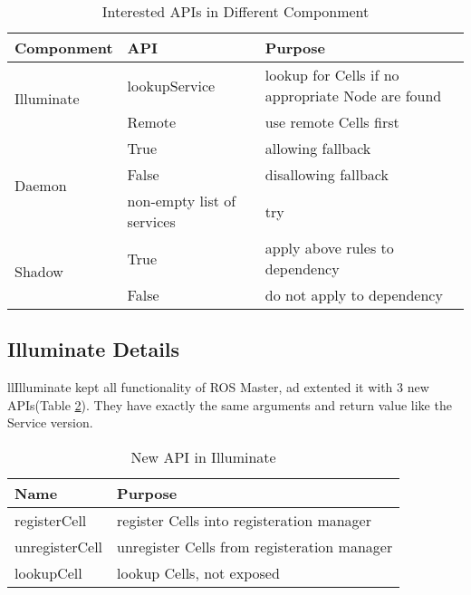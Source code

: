 \begin{table}
    \renewcommand{\arraystretch}{1.3}
    \caption{Interested APIs in Different Componment}
    \label{table:int}
    \centering
    \begin{tabular}{|l|l|l|}
        \hline
        \bfseries Componment & \bfseries  API & \bfseries Purpose \\
        \hline
        \multirow{2}{*}{Illuminate}  & lookupService & lookup for Cells if no appropriate Node are found \\
        \cline{2-3}
                                     & Remote & use remote Cells first \\
        \hline
        \multirow{3}{*}{Daemon}      & True   & allowing fallback \\
        \cline{2-3}
                                     & False  & disallowing fallback \\
        \cline{2-3}
                                     & non-empty list of services & try  \\
        \hline
        \multirow{2}{*}{Shadow} & True   & apply above rules to dependency \\
        \cline{2-3}
                                     & False  & do not apply to dependency \\
        \hline
    \end{tabular}
\end{table} 

\subsection{Illuminate Details}
llIlluminate kept all functionality of ROS Master, ad extented it with 3 new APIs(Table \ref{table:illuminate-api}).
They have exactly the same arguments and return value like the Service version.

\begin{table}[H]
    \renewcommand{\arraystretch}{1.3}
    \caption{New API in Illuminate}
    \label{table:illuminate-api}
    \centering
    \begin{tabular}{ll}
        \hline
        \bfseries Name & \bfseries Purpose \\
        \hline
        registerCell & register Cells into registeration manager  \\
        unregisterCell & unregister Cells from registeration manager \\
        lookupCell & lookup Cells, not exposed \\
        \hline
    \end{tabular}
\end{table} 

